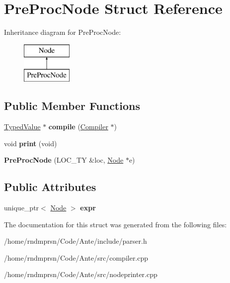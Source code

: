 \hypertarget{structPreProcNode}{}\section{Pre\+Proc\+Node Struct Reference}
\label{structPreProcNode}
Inheritance diagram for Pre\+Proc\+Node\+:\begin{figure}[H]
\begin{center}
\leavevmode
\includegraphics[height=2.000000cm]{structPreProcNode}
\end{center}
\end{figure}
\subsection*{Public Member Functions}
\begin{DoxyCompactItemize}
\item 
\mbox{\label{structPreProcNode_a4d98f4a7ee76a87619559f78610dfafd}} 
\hyperlink{structTypedValue}{Typed\+Value} $\ast$ {\bfseries compile} (\hyperlink{structante_1_1Compiler}{Compiler} $\ast$)
\item 
\mbox{\label{structPreProcNode_ad31437b329fbe48ca2bb2ce4d2588538}} 
void {\bfseries print} (void)
\item 
\mbox{\label{structPreProcNode_ab8aec3b3836fe8c852987d42d96ccde4}} 
{\bfseries Pre\+Proc\+Node} (L\+O\+C\+\_\+\+TY \&loc, \hyperlink{structNode}{Node} $\ast$e)
\end{DoxyCompactItemize}
\subsection*{Public Attributes}
\begin{DoxyCompactItemize}
\item 
\mbox{\label{structPreProcNode_a5dde53ee64f5c22c1e553a56bd9bc5a8}} 
unique\+\_\+ptr$<$ \hyperlink{structNode}{Node} $>$ {\bfseries expr}
\end{DoxyCompactItemize}


The documentation for this struct was generated from the following files\+:\begin{DoxyCompactItemize}
\item 
/home/rndmprsn/\+Code/\+Ante/include/parser.\+h\item 
/home/rndmprsn/\+Code/\+Ante/src/compiler.\+cpp\item 
/home/rndmprsn/\+Code/\+Ante/src/nodeprinter.\+cpp\end{DoxyCompactItemize}
